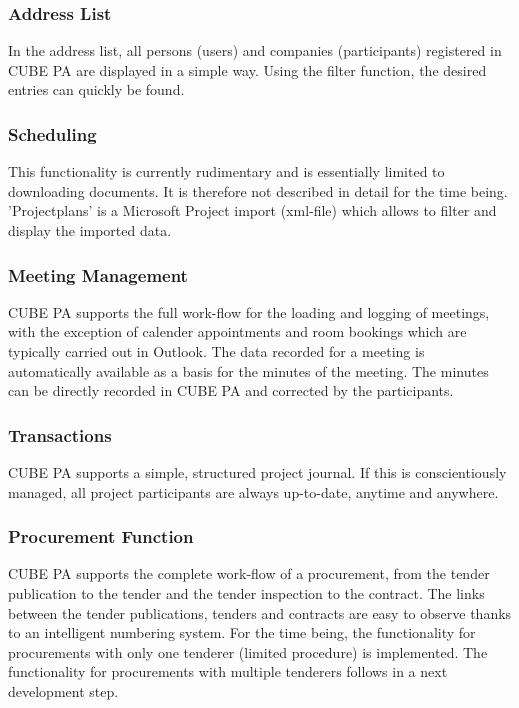 \pagebreak
\subsubsection{Address List} %

In the address list, all persons (users) and companies (participants) registered in CUBE PA are displayed in a simple way. Using the filter function, the desired entries can quickly be found.

\subsubsection{Scheduling} %

This functionality is currently rudimentary and is essentially limited to downloading documents. It is therefore not described in detail for the time being. 'Projectplans' is a Microsoft Project import (xml-file) which allows to filter and display the imported data.

\subsubsection{Meeting Management} %

CUBE PA supports the full work-flow for the loading and logging of meetings, with the exception of calender appointments and room bookings which are typically carried out in Outlook. The data recorded for a meeting is automatically available as a basis for the minutes of the meeting. The minutes can be directly recorded in CUBE PA and corrected by the participants.

\subsubsection{Transactions} %

CUBE PA supports a simple, structured project journal. If this is conscientiously managed, all project participants are always up-to-date, anytime and anywhere.

\subsubsection{Procurement Function} %

CUBE PA supports the complete work-flow of a procurement, from the tender publication to the tender and the tender inspection to the contract. The links between the tender publications, tenders and contracts are easy to observe thanks to an intelligent numbering system. For the time being, the functionality for procurements with only one tenderer (limited procedure) is implemented. The functionality for procurements with multiple tenderers follows in a next development step.

